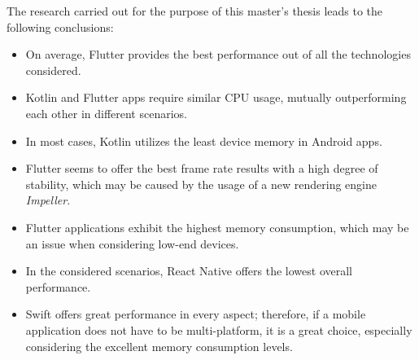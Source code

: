 The research carried out for the purpose of this master's thesis leads to the following conclusions:

\begin{itemize}
    \item On average, Flutter provides the best performance out of all the technologies considered.
    \item Kotlin and Flutter apps require similar CPU usage, mutually outperforming each other in different scenarios.
    \item In most cases, Kotlin utilizes the least device memory in Android apps.
    \item Flutter seems to offer the best frame rate results with a high degree of stability, which may be caused by the usage of a new rendering engine \emph{Impeller}.
    \item Flutter applications exhibit the highest memory consumption, which may be an issue when considering low-end devices.
    \item In the considered scenarios, React Native offers the lowest overall performance.
    \item Swift offers great performance in every aspect; therefore, if a mobile application does not have to be multi-platform, it is a great choice, especially considering the excellent memory consumption levels.
\end{itemize}

\clearpage
